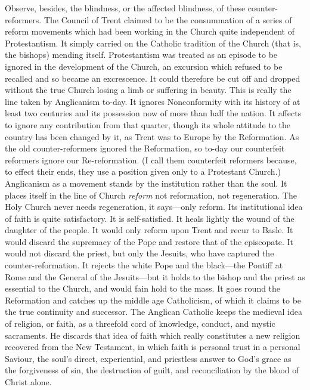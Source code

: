 \documentclass[12pt,a5paper,twoside]{book}
\begin{document}
Observe, besides, the blindness, or the affected blindness, 
of these counter-reformers. The Council of 
Trent claimed to be the consummation of a series of 
reform movements which had been working in the 
Church quite independent of Protestantism. It 
simply carried on the Catholic tradition of the Church 
(that is, the bishops) mending itself. Protestantism 
was treated as an episode to be ignored in the development 
of the Church, an excursion which refused 
to be recalled and so became an excrescence. 
It could therefore be cut off and dropped without the 
true Church losing a limb or suffering in beauty. 
This is really the line taken by Anglicanism to-day. It 
ignores Nonconformity with its history of at least two 
centuries and its possession now of more than half 
the nation. It affects to ignore any contribution 
from that quarter, though its whole attitude to the 
country has been changed by it, as Trent was to 
Europe by the Reformation. As the old counter-reformers ignored the Reformation, so to-day our 
counterfeit reformers ignore our Re-reformation. (I 
call them counterfeit reformers because, to effect their 
ends, they use a position given only to a Protestant 
Church.) Anglicanism as a movement stands by the 
institution rather than the soul. It places itself in 
the line of Church \textit{reform} not reformation, not regeneration. 
The Holy Church never needs regeneration, 
it says---only reform. Its institutional idea of 
faith is quite satisfactory. It is self-satisfied. It heals 
lightly the wound of the daughter of the people. It 
would only reform upon Trent and recur to Basle. 
It would discard the supremacy of the Pope and restore 
that of the episcopate. It would not discard the 
priest, but only the Jesuits, who have captured the 
counter-reformation. It rejects the white Pope and 
the black---the Pontiff at Rome and the General of 
the Jesuits---but it holds to the bishop and the priest 
as essential to the Church, and would fain hold to the 
mass. It goes round the Reformation and catches up 
the middle age Catholicism, of which it claims to be 
the true continuity and successor. The Anglican 
Catholic keeps the medieval idea of religion, or faith, 
as a threefold cord of knowledge, conduct, and mystic 
sacraments. He discards that idea of faith which 
really constitutes a new religion recovered from the 
New Testament, in which faith is personal trust in a 
personal Saviour, the soul's direct, experiential, and 
priestless answer to God's grace as the forgiveness of 
sin, the destruction of guilt, and reconciliation by the 
blood of Christ alone. 
\end{document}
